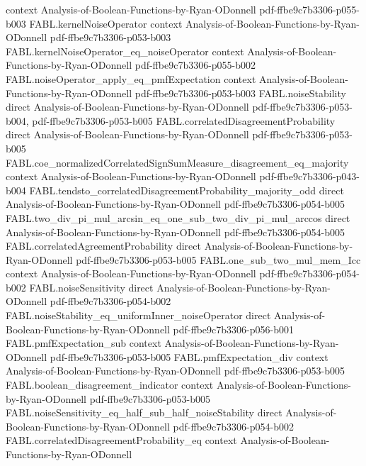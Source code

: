 \begin{theorem}
  {context}
  {Analysis-of-Boolean-Functions-by-Ryan-ODonnell}
  {pdf-ffbe9c7b3306-p055-b003}
\proofstep
  {FABL.kernelNoiseOperator}
  {context}
  {Analysis-of-Boolean-Functions-by-Ryan-ODonnell}
  {pdf-ffbe9c7b3306-p053-b003}
\proofstep
  {FABL.kernelNoiseOperator_eq_noiseOperator}
  {context}
  {Analysis-of-Boolean-Functions-by-Ryan-ODonnell}
  {pdf-ffbe9c7b3306-p055-b002}
\proofstep
  {FABL.noiseOperator_apply_eq_pmfExpectation}
  {context}
  {Analysis-of-Boolean-Functions-by-Ryan-ODonnell}
  {pdf-ffbe9c7b3306-p053-b003}
\proofstep
  {FABL.noiseStability}
  {direct}
  {Analysis-of-Boolean-Functions-by-Ryan-ODonnell}
  {pdf-ffbe9c7b3306-p053-b004,
    pdf-ffbe9c7b3306-p053-b005}
\proofstep
  {FABL.correlatedDisagreementProbability}
  {direct}
  {Analysis-of-Boolean-Functions-by-Ryan-ODonnell}
  {pdf-ffbe9c7b3306-p053-b005}
\proofstep
  {FABL.coe_normalizedCorrelatedSignSumMeasure_disagreement_eq_majority}
  {context}
  {Analysis-of-Boolean-Functions-by-Ryan-ODonnell}
  {pdf-ffbe9c7b3306-p043-b004}
\proofstep
  {FABL.tendsto_correlatedDisagreementProbability_majority_odd}
  {direct}
  {Analysis-of-Boolean-Functions-by-Ryan-ODonnell}
  {pdf-ffbe9c7b3306-p054-b005}
\proofstep
  {FABL.two_div_pi_mul_arcsin_eq_one_sub_two_div_pi_mul_arccos}
  {direct}
  {Analysis-of-Boolean-Functions-by-Ryan-ODonnell}
  {pdf-ffbe9c7b3306-p054-b005}
\proofstep
  {FABL.correlatedAgreementProbability}
  {direct}
  {Analysis-of-Boolean-Functions-by-Ryan-ODonnell}
  {pdf-ffbe9c7b3306-p053-b005}
\proofstep
  {FABL.one_sub_two_mul_mem_Icc}
  {context}
  {Analysis-of-Boolean-Functions-by-Ryan-ODonnell}
  {pdf-ffbe9c7b3306-p054-b002}
\proofstep
  {FABL.noiseSensitivity}
  {direct}
  {Analysis-of-Boolean-Functions-by-Ryan-ODonnell}
  {pdf-ffbe9c7b3306-p054-b002}
\proofstep
  {FABL.noiseStability_eq_uniformInner_noiseOperator}
  {direct}
  {Analysis-of-Boolean-Functions-by-Ryan-ODonnell}
  {pdf-ffbe9c7b3306-p056-b001}
\proofstep
  {FABL.pmfExpectation_sub}
  {context}
  {Analysis-of-Boolean-Functions-by-Ryan-ODonnell}
  {pdf-ffbe9c7b3306-p053-b005}
\proofstep
  {FABL.pmfExpectation_div}
  {context}
  {Analysis-of-Boolean-Functions-by-Ryan-ODonnell}
  {pdf-ffbe9c7b3306-p053-b005}
\proofstep
  {FABL.boolean_disagreement_indicator}
  {context}
  {Analysis-of-Boolean-Functions-by-Ryan-ODonnell}
  {pdf-ffbe9c7b3306-p053-b005}
\proofstep
  {FABL.noiseSensitivity_eq_half_sub_half_noiseStability}
  {direct}
  {Analysis-of-Boolean-Functions-by-Ryan-ODonnell}
  {pdf-ffbe9c7b3306-p054-b002}
\proofstep
  {FABL.correlatedDisagreementProbability_eq}
  {context}
  {Analysis-of-Boolean-Functions-by-Ryan-ODonnell}

\end{theorem}

